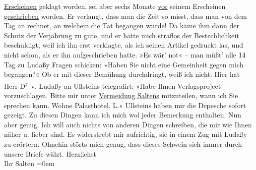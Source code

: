 \begin{ledgroupsized}[t]{13cm}
                  \uline{Erscheinen} geklagt worden, sei aber sechs Monate
                  \uline{vor} seinem Erscheinen \uline{geschrieben} worden. Er verlangt, dass man die Zeit so misst, dass man von
               dem Tag an rechnet, an welchem die Tat \uline{begangen}
               wurde! Da käme ihm dann der Schutz der Verjährung zu gute, und er hätte mich straflos
               der Bestechlichkeit beschuldigt, weil ich ihn erst verklagte, als ich seinen Artikel gedruckt las, und
               nicht schon, als er ihn aufgeschrieben hatte. »Es wär’ not« – man müßt’ alle 14 Tag
               zu Ludaßy Fragen schicken: »Haben Sie nicht
               eine Gemeinheit gegen mich begangen?« Ob er mit dieser Bemühung durchdringt, weiß ich
               nicht. \pend
           \pstart
           Hier hat Herr D\textsuperscript{r} v.
                  Ludaßy an Ullsteins telegrafirt: »Habe
               Ihnen Verlagsproject vorzuschlagen. Bitte mir unter \uline{Vermeidung Saltens} mitzuteilen, wann ich Sie sprechen kann. Wohne Palasthotel. L.« Ullsteins haben mir die Depesche
               sofort gezeigt. \pend
           \pstart
           Zu diesen Dingen kann ich mich wol jeder Bemerkung enthalten. \pend
           \pstart
           Nun aber genug. Ich will auch nichts von anderen Dingen {\pb}schreiben, die mir wie Ihnen
               näher u. lieber sind. Es widerstrebt mir aufrichtig, sie in einem Zug mit Ludaßy zu erörtern. Ohnehin störts mich genug,
               dass dieses Schwein sich immer durch unsere Briefe wälzt.\pend
           \pstart
           Herzlichst {\\[\baselineskip]}Ihr \spacefill\mbox{Salten}\pend
           \leftskip=0em{}
         
         \endnumbering{}\end{ledgroupsized}\begin{anhang}\end{anhang}\newcommand{\dateiname}{L03425}\newcommand{\titel}{Felix Salten an Arthur Schnitzler, 17. 5. 1906}\newcommand{\editorInnen}{Martin Anton Müller und Laura Untner}
      